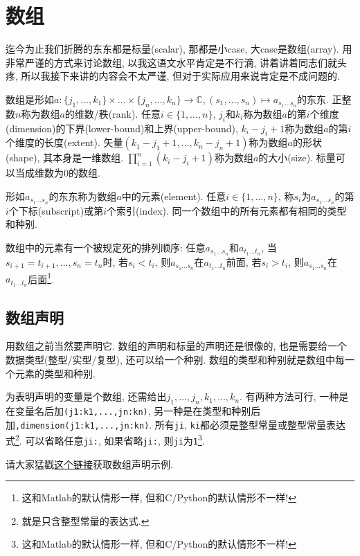\chapter{数组}\label{fortran_array}

迄今为止我们折腾的东东都是标量(scalar), 那都是小case, 大case是数组(array). 用非常严谨的方式来讨论数组, 以我这语文水平肯定是不行滴, 讲着讲着同志们就头疼, 所以我接下来讲的内容会不太严谨, 但对于实际应用来说肯定是不成问题的.

数组是形如$a\!:\!\{j_1,\dots,k_1\}\!\times\!\dots\!\times\!\{j_n,\dots,k_n\}\rightarrow\mathbb{C},(s_1,\dots,s_n)\mapsto a_{s_1\dots s_n}$的东东. 正整数$n$称为数组$a$的维数/秩(rank). 任意$i\in\{1,\dots,n\}$, $j_i$和$k_i$称为数组$a$的第$i$个维度(dimension)的下界(lower-bound)和上界(upper-bound), $k_i-j_i+1$称为数组$a$的第$i$个维度的长度(extent). 矢量$(k_1-j_1+1,\dots,k_n-j_n+1)$称为数组$a$的形状(shape), 其本身是一维数组. $\prod_{i=1}^n(k_i-j_i+1)$称为数组$a$的大小(size). 标量可以当成维数为$0$的数组.

形如$a_{s_1\dots s_n}$的东东称为数组$a$中的元素(element). 任意$i\in\{1,\dots,n\}$, 称$s_i$为$a_{s_1\dots s_n}$的第$i$个下标(subscript)或第$i$个索引(index). 同一个数组中的所有元素都有相同的类型和种别.

数组中的元素有一个被规定死的排列顺序: 任意$a_{s_1\dots s_n}$和$a_{t_1\dots t_n}$, 当$s_{i+1}=t_{i+1},\dots,s_n=t_n$时, 若$s_i<t_i$, 则$a_{s_1\dots s_n}$在$a_{t_1\dots t_n}$前面, 若$s_i>t_i$, 则$a_{s_1\dots s_n}$在$a_{t_1\dots t_n}$后面\footnote{这和Matlab的默认情形一样, 但和C/Python的默认情形不一样!}.

\section{数组声明}\label{fortran_array_specification}

用数组之前当然要声明它. 数组的声明和标量的声明还是很像的, 也是需要给一个数据类型(整型/实型/复型), 还可以给一个种别. 数组的类型和种别就是数组中每一个元素的类型和种别.

为表明声明的变量是个数组, 还需给出$j_1,\dots,j_n,k_1,\dots,k_n$. 有两种方法可行, 一种是在变量名后加\texttt{(j1:k1,...,jn:kn)}, 另一种是在类型和种别后加\texttt{,dimension(j1:k1,...,jn:kn)}. 所有\texttt{ji}, \texttt{ki}都必须是整型常量或整型常量表达式\footnote{
    就是只含整型常量的表达式.
}. 可以省略任意\texttt{ji:}, 如果省略\texttt{ji:}, 则\texttt{ji}为\texttt{1}\footnote{这和Matlab的默认情形一样, 但和C/Python的默认情形不一样!}.

请大家猛戳\href{https://fortran-lang.org/learn/quickstart/arrays_strings#array-declaration}{这个链接}获取数组声明示例.

